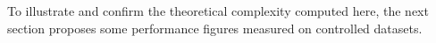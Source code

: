 \documentclass[a4paper,twoside]{article}
\newcommand{\cad}{---} %
\newcommand{\ml}[1]{\textcolor{red}{ML : #1}}
\newcommand{\mr}[1]{\textcolor{magenta}{MR : #1}}
\begin{document}
To illustrate and confirm the theoretical complexity computed here, the next section proposes some performance figures measured on controlled datasets.


%
%
%
%
%
%
\end{document}
